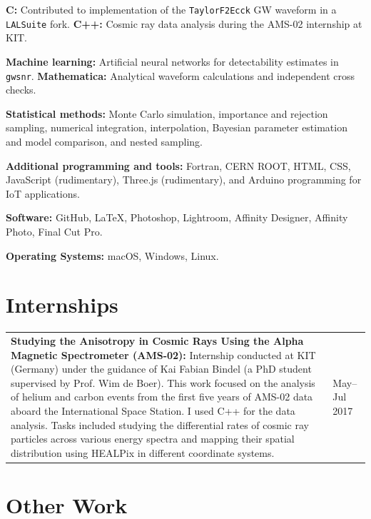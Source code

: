 \documentclass[margin,line]{res}
\begin{document}
\begin{resume}
\begin{samepage}
\textbf{C:} Contributed to implementation of the \texttt{TaylorF2Ecck} GW waveform in a \texttt{LALSuite} fork. \textbf{C++:} Cosmic ray data analysis during the AMS-02 internship at KIT.
\par\end{samepage}

\textbf{Machine learning:} Artificial neural networks for detectability estimates in \texttt{gwsnr}. \textbf{Mathematica:} Analytical waveform calculations and independent cross checks.

\textbf{Statistical methods:} Monte Carlo simulation, importance and rejection sampling, numerical integration, interpolation, Bayesian parameter estimation and model comparison, and nested sampling.

\textbf{Additional programming and tools:} Fortran, CERN ROOT, HTML, CSS, JavaScript (rudimentary), Three.js (rudimentary), and Arduino programming for IoT applications.

{\bf Software:} GitHub, \LaTeX, Photoshop, Lightroom, Affinity Designer, Affinity Photo, Final Cut Pro.

{\bf Operating Systems:} macOS, Windows, Linux.

\newpage
\section{\sc Internships}

\begin{tabular}{@{}p{\dimexpr\linewidth-0.62in-3\tabcolsep\relax}p{0.62in}}
    \textbf{Studying the Anisotropy in Cosmic Rays Using the Alpha Magnetic Spectrometer (AMS-02):} Internship conducted at KIT (Germany) under the guidance of Kai Fabian Bindel (a PhD student supervised by Prof. Wim de Boer). This work focused on the analysis of helium and carbon events from the first five years of AMS-02 data aboard the International Space Station. I used C++ for the data analysis. Tasks included studying the differential rates of cosmic ray particles across various energy spectra and mapping their spatial distribution using HEALPix in different coordinate systems. & \raggedright May--Jul 2017
\end{tabular}


\vspace{.2in}
\section{\sc Other Work}


\end{resume}
\end{document}
